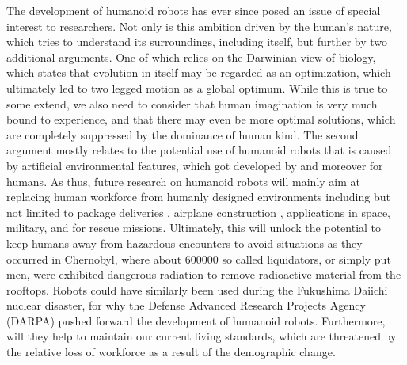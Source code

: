 \label{sec::1_in}
The development of humanoid robots has ever since posed an issue of special interest to researchers. Not only is this ambition driven by the human's nature, which tries to understand its surroundings, including itself, but further by two additional arguments. One of which relies on the Darwinian view of biology, which states that evolution in itself may be regarded as an optimization, which ultimately led to two legged motion as a global optimum. While this is true to some extend, we also need to consider that human imagination is very much bound to experience, and that there may even be more optimal solutions, which are completely suppressed by the dominance of human kind. The second argument mostly relates to the potential use of humanoid robots that is caused by artificial environmental features, which got developed by and moreover for humans. As thus, future research on humanoid robots will mainly aim at replacing human workforce from humanly designed environments including but not limited to package deliveries \cite{cassieford}, airplane construction \cite{stasse2014airbus}, applications in space, military, and for rescue missions. Ultimately, this will unlock the potential to keep humans away from hazardous encounters to avoid situations as they occurred in Chernobyl, where about 600000 \cite{kinly2006chernobyl} so called liquidators, or simply put men, were exhibited dangerous radiation to remove radioactive material from the rooftops. Robots could have similarly been used during the Fukushima Daiichi nuclear disaster, for why the Defense Advanced Research Projects Agency (DARPA) pushed forward the development of humanoid robots. Furthermore, will they help to maintain our current living standards, which are threatened by the relative loss of workforce as a result of the demographic change. \\\\
